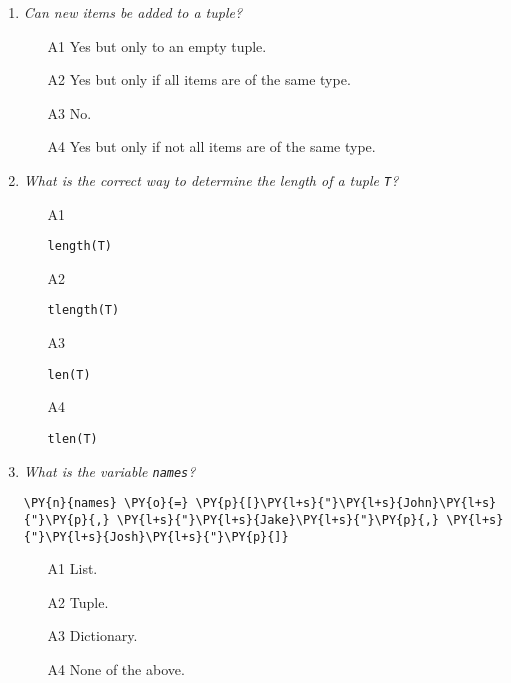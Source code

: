 \begin{enumerate}
\vspace{6mm}

\item {\em Can new items be added to a tuple?}\\

\begin{enumerate}
\item[A1] Yes but only to an empty tuple.
\item[A2] Yes but only if all items are of the same type.
\item[A3] No.
\item[A4] Yes but only if not all items are of the same type.
\end{enumerate}

\vspace{6mm}

\item {\em What is the correct way to determine the length of a tuple {\tt T}?}\\

\begin{enumerate}
\item[A1] 
\begin{verbatim}
length(T)
\end{verbatim}
\item[A2] 
\begin{verbatim}
tlength(T)
\end{verbatim}
\item[A3] 
\begin{verbatim}
len(T)
\end{verbatim}
\item[A4] 
\begin{verbatim}
tlen(T)
\end{verbatim}
\end{enumerate}

\vspace{6mm}

\item {\em What is the variable {\tt names}?}\\

\begin{Verbatim}[commandchars=\\\{\}]
\PY{n}{names} \PY{o}{=} \PY{p}{[}\PY{l+s}{"}\PY{l+s}{John}\PY{l+s}{"}\PY{p}{,} \PY{l+s}{"}\PY{l+s}{Jake}\PY{l+s}{"}\PY{p}{,} \PY{l+s}{"}\PY{l+s}{Josh}\PY{l+s}{"}\PY{p}{]}
\end{Verbatim}
\vspace{6mm}

\begin{enumerate}
\item[A1] List.
\item[A2] Tuple.
\item[A3] Dictionary.
\item[A4] None of the above.
\end{enumerate}


\end{enumerate}
